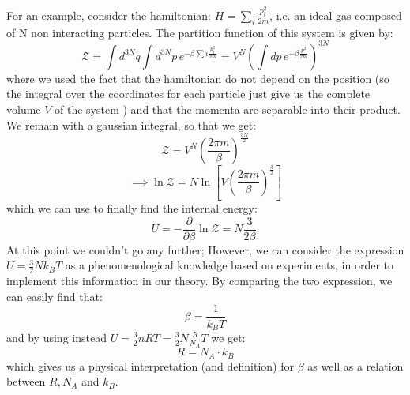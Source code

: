 For an example, consider the hamiltonian: $H=\sum_i \frac{p_i^2}{2m}$, i.e. an ideal gas composed of N non interacting particles. The partition function of this system is given by:
\begin{equation*}
    \mathcal{Z}=\int d^{3N}q \int d^{3N}p\,e^{-\beta \sum i \frac{p_i^2}{2m}}=V^N \left(\int dp\, e^{-\beta \frac{p^2}{2m}}\right)^{3N}
\end{equation*}
where we used the fact that the hamiltonian do not depend on the position (so the integral over the coordinates for each particle just give us the complete volume $V$ of the system ) and that the momenta are separable into their product. We remain with a gaussian integral, so that we get:
\begin{equation}
    \mathcal{Z}=V^N \left(\frac{2\pi m}{\beta} \right)^{\frac{3N}{2}}
\end{equation}
\begin{equation}
    \implies \ln{\mathcal{Z}}=N\ln{\left[V\left(\frac{2\pi m}{\beta} \right)^{\frac{3}{2}}\right]}
\end{equation}
which we can use to finally find the internal energy:
\begin{equation}
    U= -\frac{\partial}{\partial \beta}\ln{\mathcal{Z}}=N\frac{3}{2\beta}.
\end{equation}
At this point we couldn't go any further; However, we can consider the expression $U=\frac{3}{2}N k_B T$ as a phenomenological knowledge based on experiments, in order to implement this information in our theory. By comparing the two expression, we can easily find that:
\begin{equation}
    \beta=\frac{1}{k_B T}
\end{equation}
and by using instead $U=\frac{3}{2}n R T=\frac{3}{2}N\frac{R}{N_A} T$ we get:
\begin{equation}
    R=N_A \cdot k_B
\end{equation}
which gives us a physical interpretation (and definition) for $\beta$ as well as a relation between $R, N_A$ and $k_B$.
